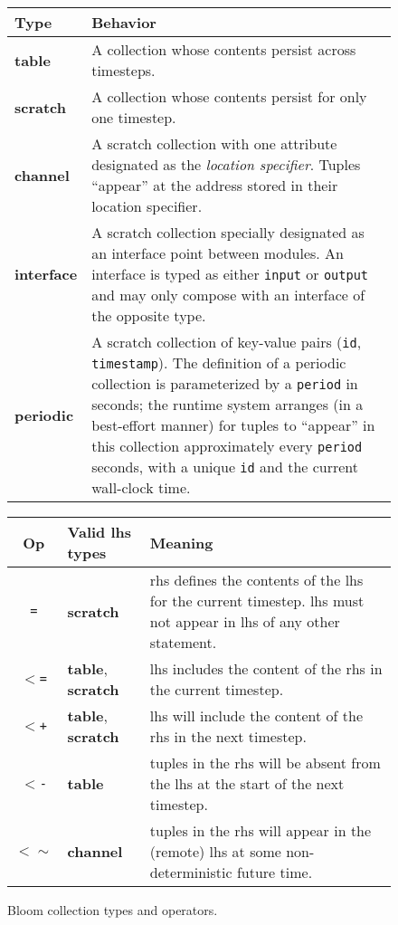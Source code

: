 \begin{figure}
	\begin{small}
	\begin{tabular}{|l|p{2.55in}|}
		\hline
		Type & Behavior\\
		\hline
		\textbf{table} & A collection whose contents persist across timesteps.\\
		\textbf{scratch} & A collection whose contents persist for only one timestep.\\
		\textbf{channel} & A scratch collection with one attribute designated as the {\em location specifier}. Tuples ``appear'' at the address stored in their location specifier.\\
    \textbf{interface} & A scratch collection specially designated as an interface point between modules.  An interface is typed as either \texttt{input} or \texttt{output} and may only compose with an interface of the opposite type.\\
		\textbf{periodic} & A scratch collection of key-value pairs (\texttt{id}, \texttt{timestamp}).  The definition of a periodic collection is parameterized by a \texttt{period} in seconds; the runtime system arranges (in a best-effort manner) for tuples to ``appear'' in this collection approximately every \texttt{period} seconds, with a unique \texttt{id} and the current wall-clock time.\\
		\hline
	\end{tabular}

	\vspace{2em}
	\begin{tabular}{|c|l|p{2in}|}
		\hline
		Op & Valid lhs types & Meaning\\
				\hline 
		\texttt{=} & \textbf{scratch} & rhs defines the contents of the lhs for the current timestep.  lhs must not appear in lhs of any other statement.\\
		\texttt{$<$=} & \textbf{table}, \textbf{scratch} & lhs includes the content of the rhs in the current timestep.\\
		\texttt{$<$+} & \textbf{table}, \textbf{scratch} & lhs will include the content of the rhs in the next timestep.\\
		\texttt{$<$-} & \textbf{table} & tuples in the rhs will be absent from the lhs at the start of  the next timestep.\\
		\texttt{$<\sim$} & \textbf{channel} & tuples in the rhs will appear in the (remote) lhs at some non-deterministic future time.\\
		\hline
	\end{tabular}
	\end{small}
	\caption{Bloom collection types and operators.}
	\label{tab:bloom}
\end{figure}

